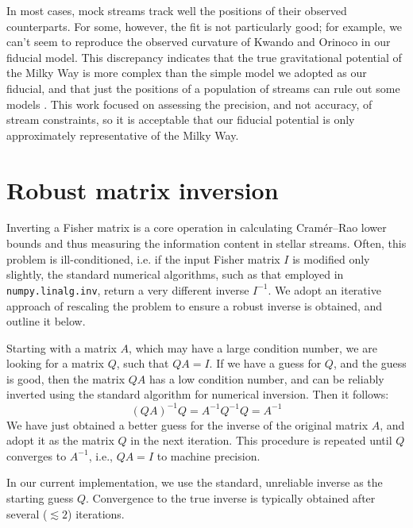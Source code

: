 \documentclass[modern]{aastex61}
\begin{document}
In most cases, mock streams track well the positions of their observed counterparts.
For some, however, the fit is not particularly good; for example, we can't seem to reproduce the observed curvature of Kwando and Orinoco in our fiducial model.
This discrepancy indicates that the true gravitational potential of the Milky Way is more complex than the simple model we adopted as our fiducial, and that just the positions of a population of streams can rule out some models \citep[cf.][]{pearson2015}.
This work focused on assessing the precision, and not accuracy, of stream constraints, so it is acceptable that our fiducial potential is only approximately representative of the Milky Way.

\section{Robust matrix inversion}
\label{sec:inversion}
Inverting a Fisher matrix is a core operation in calculating Cram\' er--Rao lower bounds and thus measuring the information content in stellar streams. 
Often, this problem is ill-conditioned, i.e. if the input Fisher matrix $I$ is modified only slightly, the standard numerical algorithms, such as that employed in \texttt{numpy.linalg.inv}, return a very different inverse $I^{-1}$.
We adopt an iterative approach of rescaling the problem to ensure a robust inverse is obtained, and outline it below.

Starting with a matrix $A$, which may have a large condition number, we are looking for a matrix $Q$, such that $Q A = I$.
If we have a guess for $Q$, and the guess is good, then the matrix $QA$ has a low condition number, and can be reliably inverted using the standard algorithm for numerical inversion.
Then it follows:
\begin{equation*}
(QA)^{-1} Q = A^{-1} Q^{-1} Q = A^{-1}
\end{equation*}
We have just obtained a better guess for the inverse of the original matrix $A$, and adopt it as the matrix $Q$ in the next iteration.
This procedure is repeated until $Q$ converges to $A^{-1}$, i.e., $Q A = I$ to machine precision.

In our current implementation, we use the standard, unreliable inverse as the starting guess $Q$. 
Convergence to the true inverse is typically obtained after several ($\lesssim2$) iterations.
\end{document}
